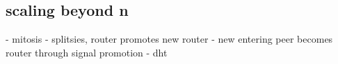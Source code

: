 \subsection{scaling beyond n}
- mitosis
    - splitsies, router promotes new router
    - new entering peer becomes router through signal promotion
- dht
